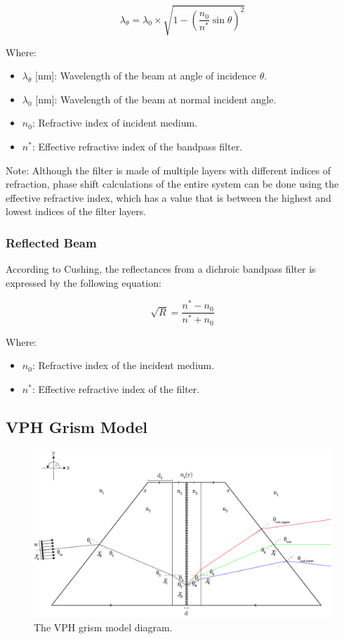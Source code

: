 \documentclass{article}
\begin{document}
\begin{equation} \label{eq:phase-shift}
    \lambda_\theta = \lambda_0 \times \sqrt{1 - \left( \frac{n_0}{n^*} \sin\theta \right)^2}
\end{equation}

Where:
\begin{itemize}[label={}]
    \item $\lambda_\theta$ [\si{\nm}]: Wavelength of the beam at angle of incidence $\theta$.
    \item $\lambda_0$ [\si{\nm}]: Wavelength of the beam at normal incident angle.
    \item $n_0$: Refractive index of incident medium.
    \item $n^*$: Effective refractive index of the bandpass filter.
\end{itemize}

Note: Although the filter is made of multiple layers with different indices of refraction, phase shift calculations of the entire system can be done using the effective refractive index, which has a value that is between the highest and lowest indices of the filter layers.

\subsubsection{Reflected Beam}
According to Cushing, the reflectances from a dichroic bandpass filter is expressed by the following equation:

\begin{equation} \label{eq:reflected-beam}
    \sqrt R = \frac{n^* - n_0}{n^* + n_0}
\end{equation}

Where:
\begin{itemize}[label={}]
    \item $n_0$: Refractive index of the incident medium.
    \item $n^*$: Effective refractive index of the filter.
\end{itemize}

\subsection{VPH Grism Model} 

\begin{figure}[H]
\centering
\includegraphics[width=\textwidth]{figures/grism-model.png}
\caption{The VPH grism model diagram.}
\label{fig:grism-model}
\end{figure}
\end{document}
